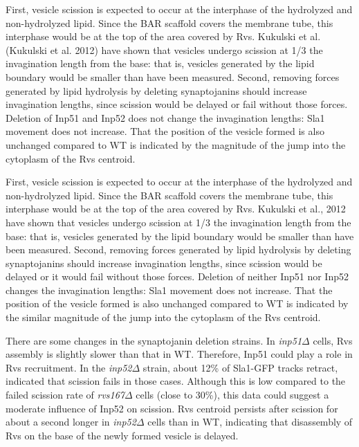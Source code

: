 \vspace{5mm}

First, vesicle scission is expected to occur at the interphase of the hydrolyzed and non-hydrolyzed lipid. Since the BAR scaffold covers the membrane tube, this interphase would be at the top of the area covered by Rvs. Kukulski et al. (Kukulski et al. 2012) have shown that vesicles undergo scission at 1/3 the invagination length from the base: that is, vesicles generated by the lipid boundary would be smaller than have been measured. Second, removing forces generated by lipid hydrolysis by deleting synaptojanins should increase invagination lengths, since scission would be delayed or fail without those forces. Deletion of Inp51 and Inp52 does not change the invagination lengths: Sla1 movement does not increase. That the position of the vesicle formed is also unchanged compared to WT is indicated by the magnitude of the jump into the cytoplasm of the Rvs centroid. 

\vspace{5mm}

First, vesicle scission is expected to occur at the interphase of the hydrolyzed and non-hydrolyzed lipid. Since the BAR scaffold covers the membrane tube, this interphase would be at the top of the area covered by Rvs. Kukulski et al., 2012 have shown that vesicles undergo scission at 1/3 the invagination length from the base: that is, vesicles generated by the lipid boundary would be smaller than have been measured. Second, removing forces generated by lipid hydrolysis by deleting synaptojanins should increase invagination lengths, since scission would be delayed or it would fail without those forces. Deletion of neither Inp51 nor Inp52 changes the invagination lengths: Sla1 movement does not increase. That the position of the vesicle formed is also unchanged compared to WT is indicated by the similar magnitude of the jump into the cytoplasm of the Rvs centroid. 


\vspace{5mm}
There are some changes in the synaptojanin deletion strains. In \textit{inp51$\Delta$} cells, Rvs assembly is slightly slower than that in WT. Therefore, Inp51 could play a role in Rvs recruitment. In the \textit{inp52$\Delta$} strain, about 12\% of Sla1-GFP tracks retract, indicated that scission fails in those cases. Although this is low compared to the failed scission rate of \textit{rvs167$\Delta$} cells (close to 30\%), this data could suggest a moderate influence of Inp52 on scission. Rvs centroid persists after scission for about a second longer in \textit{inp52$\Delta$} cells than in WT, indicating that disassembly of Rvs on the base of the newly formed vesicle is delayed.

